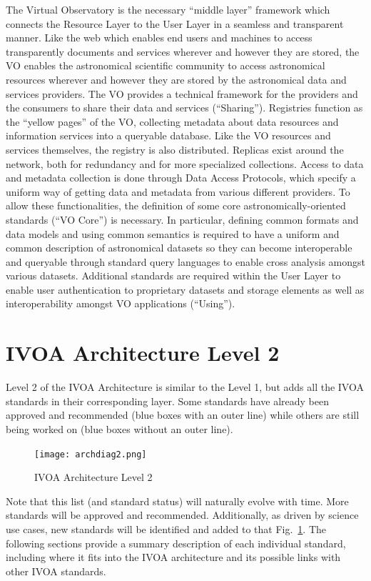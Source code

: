 \documentclass[11pt,a4paper]{ivoa}
\begin{document}
The Virtual Observatory is the necessary ``middle layer'' framework which connects the
Resource Layer to the User Layer in a seamless and transparent manner. Like the web
which enables end users and machines to access transparently documents and services
wherever and however they are stored, the VO enables the astronomical scientific community
to access astronomical resources wherever and however they are stored by the astronomical
data and services providers. The VO provides a technical framework for the providers and
the consumers to share their data and services (“Sharing”). Registries function as the ``yellow
pages'' of the VO, collecting metadata about data resources and information services into a 
queryable database. Like the VO resources and services themselves, the registry is also 
distributed. Replicas exist around the network, both for redundancy and for more specialized 
collections. Access to data and metadata collection is done through Data Access Protocols, 
which specify a uniform way of getting data and metadata from various different providers. 
To allow these functionalities, the definition of some core astronomically-oriented standards 
(“VO Core”) is necessary. In particular, defining common formats and data  models and using
common semantics is required to have a uniform and common description of astronomical datasets 
so they can become interoperable and queryable through standard query languages to enable cross
analysis amongst various datasets. Additional standards are required within the User Layer to enable
user authentication to proprietary datasets and storage elements as well as interoperability amongst 
VO applications (“Using”).

\section{IVOA Architecture Level 2}

Level 2 of the IVOA Architecture is similar to the Level 1, but adds all the IVOA 
standards in  their corresponding layer. Some  standards  have  already  been  approved 
and recommended (blue boxes with an outer line) while others are still being worked 
on (blue boxes without an outer line).

\begin{figure}[h]
\centering
\texttt{[image: archdiag2.png]}
\caption{IVOA Architecture Level 2}
\label{fig:architecture2}
\end{figure}

Note that this list  (and standard  status) will naturally evolve with time. More 
standards will be approved and recommended. Additionally, as driven by science use 
cases, new standards will be identified and added to that Fig.~\ref{fig:architecture2}. 
The following sections provide a summary description of each individual standard, including 
where it fits into the IVOA architecture and its possible links with other IVOA standards.
\end{document}
